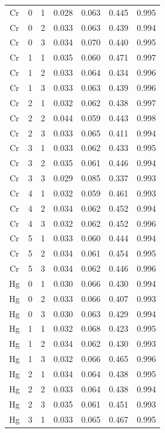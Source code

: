 \documentclass[ms, hidelinks]{uncgdissertationexp}
\theoremstyle{plain}
\theoremstyle{definition}
\theoremstyle{remark}
\begin{document}
\begin{longtable}{ccccccc}
\rowcolor{gray!6}  Cr & 0 & 1 & 0.028 & 0.063 & 0.445 & 0.995\\
Cr & 0 & 2 & 0.033 & 0.063 & 0.439 & 0.994\\
\rowcolor{gray!6}  Cr & 0 & 3 & 0.034 & 0.070 & 0.440 & 0.995\\
Cr & 1 & 1 & 0.035 & 0.060 & 0.471 & 0.997\\
\rowcolor{gray!6}  Cr & 1 & 2 & 0.033 & 0.064 & 0.434 & 0.996\\
Cr & 1 & 3 & 0.033 & 0.063 & 0.439 & 0.996\\
\rowcolor{gray!6}  Cr & 2 & 1 & 0.032 & 0.062 & 0.438 & 0.997\\
Cr & 2 & 2 & 0.044 & 0.059 & 0.443 & 0.998\\
\rowcolor{gray!6}  Cr & 2 & 3 & 0.033 & 0.065 & 0.411 & 0.994\\
Cr & 3 & 1 & 0.033 & 0.062 & 0.433 & 0.995\\
\rowcolor{gray!6}  Cr & 3 & 2 & 0.035 & 0.061 & 0.446 & 0.994\\
Cr & 3 & 3 & 0.029 & 0.085 & 0.337 & 0.993\\
\rowcolor{gray!6}  Cr & 4 & 1 & 0.032 & 0.059 & 0.461 & 0.993\\
Cr & 4 & 2 & 0.034 & 0.062 & 0.452 & 0.994\\
\rowcolor{gray!6}  Cr & 4 & 3 & 0.032 & 0.062 & 0.452 & 0.996\\
Cr & 5 & 1 & 0.033 & 0.060 & 0.444 & 0.994\\
\rowcolor{gray!6}  Cr & 5 & 2 & 0.034 & 0.061 & 0.454 & 0.995\\
Cr & 5 & 3 & 0.034 & 0.062 & 0.446 & 0.996\\
\rowcolor{gray!6}  Hg & 0 & 1 & 0.030 & 0.066 & 0.430 & 0.994\\
Hg & 0 & 2 & 0.033 & 0.066 & 0.407 & 0.993\\
\rowcolor{gray!6}  Hg & 0 & 3 & 0.030 & 0.063 & 0.429 & 0.994\\
Hg & 1 & 1 & 0.032 & 0.068 & 0.423 & 0.995\\
\rowcolor{gray!6}  Hg & 1 & 2 & 0.034 & 0.062 & 0.430 & 0.993\\
Hg & 1 & 3 & 0.032 & 0.066 & 0.465 & 0.996\\
\rowcolor{gray!6}  Hg & 2 & 1 & 0.034 & 0.064 & 0.438 & 0.995\\
Hg & 2 & 2 & 0.033 & 0.064 & 0.438 & 0.994\\
\rowcolor{gray!6}  Hg & 2 & 3 & 0.035 & 0.061 & 0.451 & 0.993\\
Hg & 3 & 1 & 0.033 & 0.065 & 0.467 & 0.995\\

\end{longtable}
\end{document}
